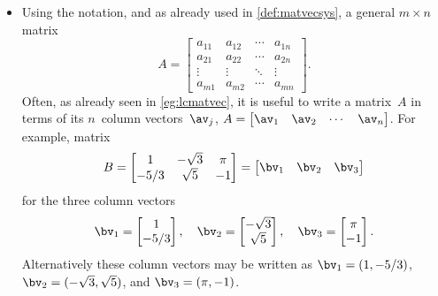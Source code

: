 \begin{itemize}
\item Using the  notation, and as already used in \cref{def:matvecsys}, a general \(m\times n\) matrix
\begin{equation*}
A=\begin{bmatrix}  a_{11}&a_{12}&\cdots&a_{1n}
\\a_{21}&a_{22}&\cdots&a_{2n}
\\\vdots&\vdots&\ddots&\vdots
\\a_{m1}&a_{m2}&\cdots&a_{mn} \end{bmatrix}.
\end{equation*}
Often, as already seen in \cref{eg:lcmatvec}, it is useful to write a matrix~\(A\) in terms of its \(n\)~column vectors~\(\av_j\), \(A=\begin{bmatrix} \av_1&\av_2&\cdots&\av_n \end{bmatrix}\).
For example, matrix
\begin{equation*}
B=\begin{bmatrix}   1 & -\sqrt3 & \pi
\\ -5/3 & \sqrt5 & -1 \end{bmatrix}
=\begin{bmatrix} \bv_1&\bv_2&\bv_3 \end{bmatrix}
\end{equation*}
for the three column vectors
\begin{equation*}
\bv_1=\begin{bmatrix}   1 \\ -5/3 \end{bmatrix},\quad
\bv_2=\begin{bmatrix} -\sqrt3 \\ \sqrt5 \end{bmatrix},\quad
\bv_3=\begin{bmatrix} \pi \\ -1 \end{bmatrix}.
\end{equation*}
Alternatively these column vectors may be written as 
\(\bv_1=(  1,-5/3)\),
\(\bv_2=(-\sqrt3,\sqrt5)\), and
\(\bv_3=(\pi,-1)\).




\end{itemize}
